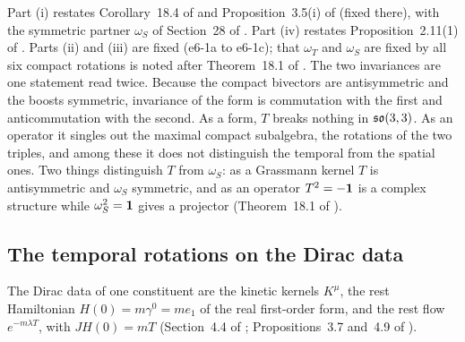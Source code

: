 Part (i) restates Corollary~18.4 of \cite{ES17} and Proposition~3.5(i) of \cite{RE} (fixed there), with the symmetric partner $\omega_S$ of
Section~28 of \cite{ES17}. Part (iv) restates Proposition~2.11(1) of \cite{RE}. Parts (ii) and (iii) are fixed (e6-1a to e6-1c); that $\omega_T$ and
$\omega_S$ are fixed by all six compact rotations is noted after Theorem~18.1 of \cite{ES17}. The two invariances are one statement read twice.
Because the compact bivectors are antisymmetric and the boosts symmetric, invariance of the form is commutation with the first and
anticommutation with the second. As a form, $T$ breaks nothing in $\mathfrak{so}(3,3)$. As an operator it singles out the maximal compact subalgebra, the
rotations of the two triples, and among these it does not distinguish the temporal from the spatial ones. Two things distinguish $T$ from
$\omega_S$: as a Grassmann kernel $T$ is antisymmetric and $\omega_S$ symmetric, and as an operator $T^2=-\mathbf 1$ is a complex structure while
$\omega_S^2=\mathbf 1$ gives a projector (Theorem~18.1 of \cite{ES17}).

\subsection{The temporal rotations on the Dirac data}
\label{e6:sec:dirac}

The Dirac data of one constituent are the kinetic kernels $K^\mu$, the rest Hamiltonian $H(0)=m\gamma^0=me_1$ of the real first-order form,
and the rest flow $e^{-m\lambda T}$, with $JH(0)=mT$ (Section~4.4 of \cite{ES17}; Propositions~3.7 and~4.9 of \cite{RE}).


